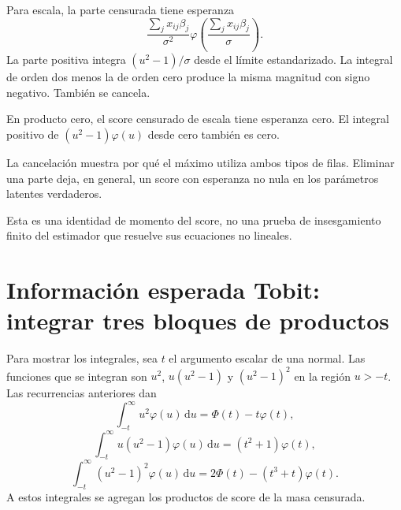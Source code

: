 \documentclass[11pt,a4paper]{article}
\newcommand{\dd}{\,\mathrm d}
\begin{document}
Para escala, la parte censurada
tiene esperanza
\[
\frac{\sum_jx_{ij}\beta_j}{\sigma^2}
\varphi\left(\frac{\sum_jx_{ij}\beta_j}{\sigma}\right).
\]
La parte positiva integra
\((u^2-1)/\sigma\)
desde el límite estandarizado.
La integral de orden dos
menos la de orden cero
produce la misma magnitud
con signo negativo.
También se cancela.

\begin{ejemplo}[Comprobación]
En producto cero,
el score censurado de escala
tiene esperanza cero.
El integral positivo de
\((u^2-1)\varphi(u)\) desde cero
también es cero.
\end{ejemplo}
La cancelación muestra por qué
el máximo utiliza ambos tipos
de filas. Eliminar una parte
deja, en general, un score
con esperanza no nula
en los parámetros latentes verdaderos.

Esta es una identidad de
momento del score, no
una prueba de insesgamiento
finito del estimador que
resuelve sus ecuaciones no lineales.

\clearpage
\section{Información esperada Tobit: integrar tres bloques de productos}\label{unidad101}
Para mostrar los integrales, sea \(t\)
el argumento escalar de una normal.
Las funciones que se integran
son \(u^2\), \(u(u^2-1)\)
y \((u^2-1)^2\) en
la región \(u>-t\).
Las recurrencias anteriores dan
\[
\int_{-t}^\infty u^2\varphi(u)\dd u
=\Phi(t)-t\varphi(t),
\]
\[
\int_{-t}^\infty u(u^2-1)\varphi(u)\dd u
=(t^2+1)\varphi(t),
\]
\[
\int_{-t}^\infty (u^2-1)^2\varphi(u)\dd u
=2\Phi(t)-(t^3+t)\varphi(t).
\]
A estos integrales se agregan
los productos de score
de la masa censurada.
\end{document}
